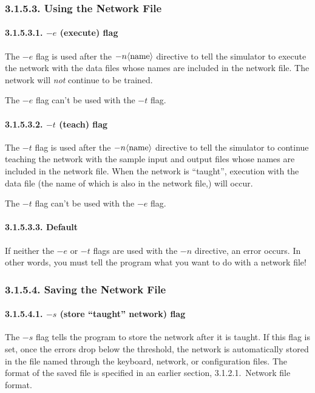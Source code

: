 \documentclass[12pt]{report}
\begin{document}
\subsubsection{3.1.5.3. Using the Network File}

\paragraph{3.1.5.3.1. $-e$ (execute) flag}

The $-e$ flag is used after the $-n\langle{\rm name}\rangle$
directive to tell the simulator to execute the network with the data
files whose names are included in the network file.
The network will {\sl not} continue to be trained.

The $-e$ flag can't be used with the $-t$ flag.

\paragraph{3.1.5.3.2. $-t$ (teach) flag}

The $-t$ flag is used after the $-n\langle{\rm name}\rangle$
directive to tell the simulator to continue teaching the network
with the sample input and output files whose names are included in
the network file.
When the network is ``taught'', execution with the data file (the
name of which is also in the network file,) will occur.

The $-t$ flag can't be used with the $-e$ flag.

\paragraph{3.1.5.3.3. Default}

If neither the $-e$ or $-t$ flags are used with the $-n$ directive,
an error occurs.
In other words, you must tell the program what you want to do with a
network file!

\subsubsection{3.1.5.4. Saving the Network File}

\paragraph{3.1.5.4.1. $-s$ (store ``taught'' network) flag}

The $-s$ flag tells the program to store the network after it is
taught.
If this flag is set, once the errors drop below the threshold, the
network is automatically stored in the file named through the
keyboard, network, or configuration files.
The format of the saved file is specified in an earlier section,
3.1.2.1.~Network file format.
\end{document}

